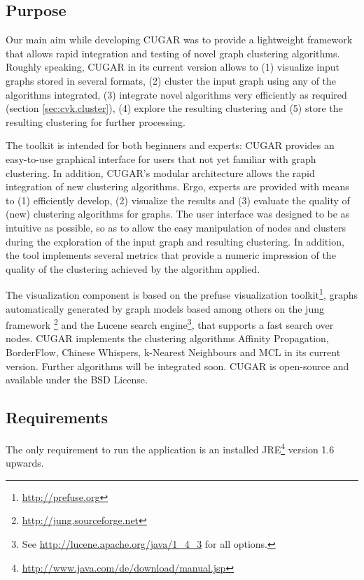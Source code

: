 \documentclass[a4paper, 11pt]{article}
\begin{document}
	\subsection{Purpose}
		Our main aim while developing CUGAR was to provide a lightweight framework that allows rapid integration 
		and testing of novel graph clustering algorithms. Roughly speaking, CUGAR in its current version allows to 
		(1) visualize input graphs stored in several formats, 
		(2) cluster the input graph using any of the algorithms integrated, 
		(3) integrate novel algorithms very efficiently as required (section \ref{sec:cvk.cluster}), 
		(4) explore the resulting clustering and 
		(5) store the resulting clustering for further processing.

		The toolkit is intended for both beginners and experts: CUGAR provides an easy-to-use graphical interface 
		for users that not yet familiar with graph clustering. In addition, CUGAR's modular architecture allows the 
		rapid integration of new clustering algorithms. Ergo, experts are provided with means to 
		(1) efficiently develop, 
		(2) visualize the results and 
		(3) evaluate the quality of (new) clustering algorithms for graphs. 
		The user interface was designed to be as intuitive as possible, so as to allow the easy manipulation of 
		nodes and clusters during the exploration of the input graph and resulting clustering. In addition, the 
		tool implements several metrics that provide a numeric impression of the quality of the clustering 
		achieved by the algorithm applied. 

		The visualization component is based on the prefuse visualization toolkit\footnote{\url{http://prefuse.org}}, 
		graphs automatically generated by graph models based among others on the jung framework
		\footnote{\url{http://jung.sourceforge.net}} and the Lucene search 
		engine\footnote{See \url{http://lucene.apache.org/java/1\_4\_3} for all options.}, that 
		supports a fast search over nodes. 
		CUGAR implements the clustering algorithms Affinity Propagation, BorderFlow, Chinese Whispers, k-Nearest Neighbours 
		and MCL in its current version. Further algorithms will be integrated soon. 
		CUGAR is open-source and available under the BSD License.

	\subsection{Requirements}
		The only requirement to run the application is an installed 
		JRE\footnote{\url{http://www.java.com/de/download/manual.jsp}} version 1.6 upwards. 
\newpage
\end{document}
